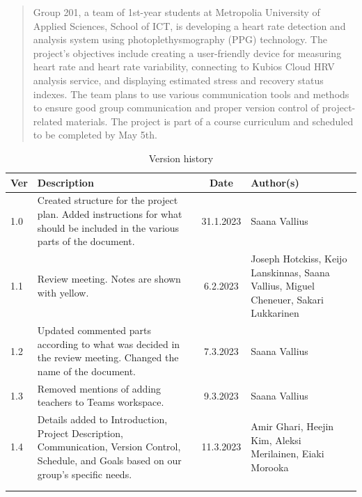 \documentclass{article}
\begin{document}
\newpage

\begin{abstract}
Group 201, a team of 1st-year students at Metropolia University of Applied Sciences, School of ICT, is developing a heart rate detection and analysis system using photoplethysmography (PPG) technology. The project's objectives include creating a user-friendly device for measuring heart rate and heart rate variability, connecting to Kubios Cloud HRV analysis service, and displaying estimated stress and recovery status indexes. The team plans to use various communication tools and methods to ensure good group communication and proper version control of project-related materials. The project is part of a course curriculum and scheduled to be completed by May 5th.
\end{abstract}





\vspace{1cm}

\begin{table}[h]
\centering
\begin{tabular}{|p{1cm}|p{5cm}|c|p{3.5cm}|}
\hline
\textbf{Ver} & \textbf{Description} & \textbf{Date} & \textbf{Author(s)} \\ \hline
1.0 & Created structure for the project plan. Added instructions for what should be included in the various parts of the document.   & 31.1.2023 & Saana Vallius \\ \hline
1.1 & Review meeting. Notes are shown with yellow.  & 6.2.2023 & Joseph Hotckiss,  Keijo Lanskinnas, Saana Vallius, Miguel Cheneuer, Sakari Lukkarinen \\ \hline
1.2 & Updated commented parts according to what was decided in the review meeting. Changed the name of the document. & 7.3.2023 & Saana Vallius \\ \hline
1.3 &  Removed mentions of adding teachers to Teams workspace. & 9.3.2023 & Saana Vallius \\ \hline
1.4 &  Details added to Introduction, Project Description, Communication, Version Control, Schedule, and Goals based on our group's specific needs.  & 11.3.2023 & Amir Ghari, Heejin Kim, Aleksi Merilainen, Eiaki Morooka \\ \hline
 &  &  &  \\ \hline
 &  &  &  \\ \hline
\end{tabular}
\caption{Version history}
\label{table:version-history}
\end{table}
\end{document}
